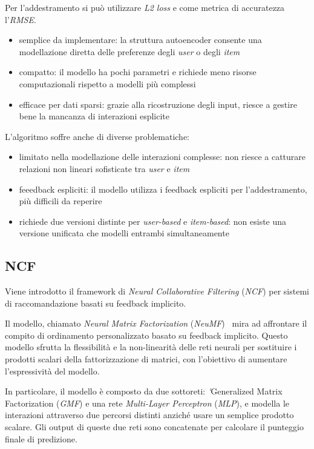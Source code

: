 Per l'addestramento si può utilizzare \textit{L2 loss} e come metrica di accuratezza l'\textit{RMSE}.

\begin{itemize}
  \item semplice da implementare: la struttura autoencoder consente una modellazione diretta delle preferenze degli \textit{user} o degli \textit{item}
  \item compatto: il modello ha pochi parametri e richiede meno risorse computazionali rispetto a modelli più complessi
  \item efficace per dati sparsi: grazie alla ricostruzione degli input, riesce a gestire bene la mancanza di interazioni esplicite
\end{itemize}

L'algoritmo soffre anche di diverse problematiche:

\begin{itemize}
  \item limitato nella modellazione delle interazioni complesse: non riesce a catturare relazioni non lineari sofisticate tra \textit{user} e \textit{item}
  \item feeedback espliciti: il modello utilizza i feedback espliciti per l'addestramento, più difficili da reperire
  \item richiede due versioni distinte per \textit{user-based} e \textit{item-based}: non esiste una versione unificata che modelli entrambi simultaneamente
\end{itemize}

\subsection{NCF}\label{ncf}
Viene introdotto il framework di \textit{Neural Collaborative Filtering} (\textit{NCF}) per sistemi di raccomandazione basati su feedback implicito.

Il modello, chiamato \textit{Neural Matrix Factorization} (\textit{NeuMF})~\cite{NeuMF} mira ad affrontare il compito di ordinamento personalizzato basato su feedback implicito. Questo modello sfrutta la flessibilità e la non-linearità delle reti neurali per sostituire i prodotti scalari della fattorizzazione di matrici, con l'obiettivo di aumentare l'espressività del modello.

In particolare, il modello è composto da due sottoreti: \textit'{Generalized Matrix Factorization} (\textit{GMF}) e una rete \textit{Multi-Layer Perceptron} (\textit{MLP}), e modella le interazioni attraverso due percorsi distinti anziché usare un semplice prodotto scalare. Gli output di queste due reti sono concatenate per calcolare il punteggio finale di predizione.

